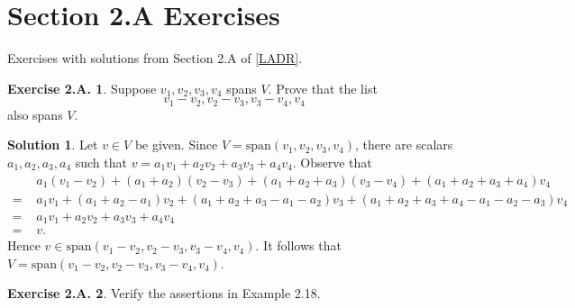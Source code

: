 \documentclass[12pt]{article}
\theoremstyle{definition}
\theoremstyle{exercise}
\newtheorem{exercise}{Exercise 2.A.}
\theoremstyle{solution}
\newtheorem*{solution}{Solution}
\newcommand{\Span}{\text{span}}
\begin{document}
\section{Section 2.A Exercises}

Exercises with solutions from Section 2.A of \hyperlink{ladr}{[LADR]}.

\begin{exercise}
\label{ex:1}
    Suppose \( v_1, v_2, v_3, v_4 \) spans \( V \). Prove that the list
    \[
        v_1 - v_2, v_2 - v_3, v_3 - v_4, v_4
    \]
    also spans \( V \).
\end{exercise}

\begin{solution}
    Let \( v \in V \) be given. Since \( V = \Span (v_1, v_2, v_3, v_4) \), there are scalars \( a_1, a_2, a_3, a_4 \) such that \( v = a_1 v_1 + a_2 v_2 + a_3 v_3 + a_4 v_4 \). Observe that
    \begin{align*}
        & a_1 (v_1 - v_2) + (a_1 + a_2) (v_2 - v_3) + (a_1 + a_2 + a_3) (v_3 - v_4) + (a_1 + a_2 + a_3 + a_4) v_4 \\
        = \,\, & a_1 v_1 + (a_1 + a_2 - a_1) v_2 + (a_1 + a_2 + a_3 - a_1 - a_2) v_3 + (a_1 + a_2 + a_3 + a_4 - a_1 - a_2 - a_3) v_4 \\
        = \,\, & a_1 v_1 + a_2 v_2 + a_3 v_3 + a_4 v_4 \\
        = \,\, & v.
    \end{align*}
    Hence \( v \in \Span (v_1 - v_2, v_2 - v_3, v_3 - v_4, v_4) \). It follows that \( V = \Span (v_1 - v_2, v_2 - v_3, v_3 - v_4, v_4) \).
\end{solution}

\begin{exercise}
\label{ex:2}
    Verify the assertions in Example 2.18.
\end{exercise}
\end{document}
